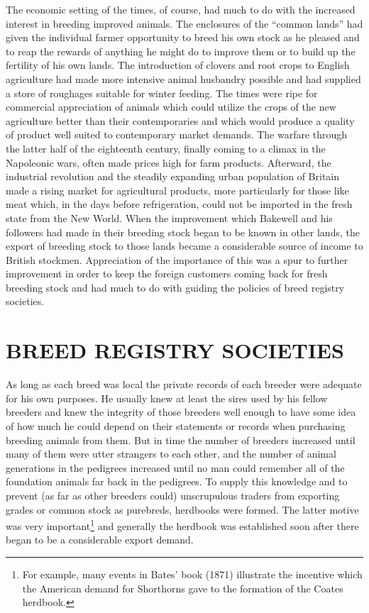 The economic setting of the times, of course, had much to do with the increased interest in breeding improved animals. The 
enclosures of the ``common lands'' had given the individual farmer opportunity to breed his own stock as he pleased and to 
reap the rewards of anything he might do to improve them or to build up the fertility of his own lands. The introduction of 
clovers and root crops to English agriculture had made more intensive animal husbandry possible and had supplied a store of 
roughages suitable for winter feeding. The times were ripe for commercial appreciation of animals which could utilize the 
crops of the new agriculture better than their contemporaries and which would produce a quality of product well suited to 
contemporary market demands. The warfare through the latter half of the eighteenth century, finally coming to a climax in 
the Napoleonic wars, often made prices high for farm products. Afterward, the industrial revolution and the steadily 
expanding urban population of Britain made a rising market for agricultural products, more particularly for those like meat 
which, in the days before refrigeration, could not be imported in the fresh state from the New World. When the improvement 
which Bakewell and his followers had made in their breeding stock began to be known in other lands, the export of breeding 
stock to those lands became a considerable source of income to British stockmen. Appreciation of the importance of this was 
a spur to further improvement in order to keep the foreign customers coming back for fresh breeding stock and had much to do 
with guiding the policies of breed registry societies.

\section*{BREED REGISTRY SOCIETIES}

As long as each breed was local the private records of each breeder were adequate for his own purposes. He usually knew at 
least the sires used by his fellow breeders and knew the integrity of those breeders well enough to have some idea of how 
much he could depend on their statements or records when purchasing breeding animals from them. But in time the number of 
breeders increased until many of them were utter strangers to each other, and the number of animal generations in the 
pedigrees increased until no man could remember all of the foundation animals far back in the pedigrees. To supply this 
knowledge and to prevent (as far as other breeders could) unscrupulous traders from exporting grades or common stock as 
purebreds, herdbooks were formed. The latter motive was very important\footnote{For example, many events in Bates' book
(1871) illustrate the incentive which the American demand for Shorthorns gave to the formation of the Coates herdbook.} 
and generally the herdbook was established soon after there began to be a considerable export demand.

